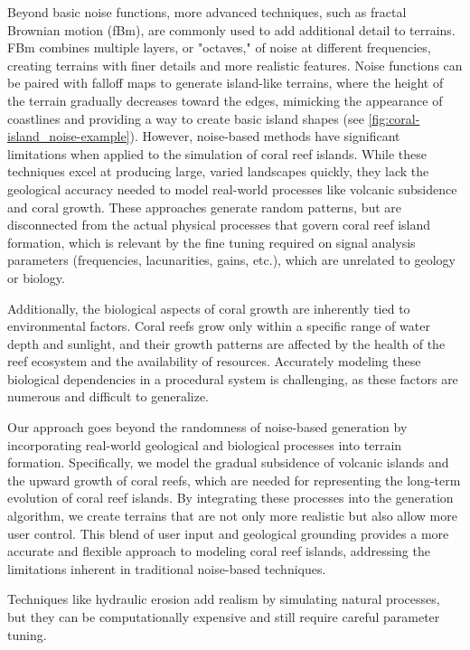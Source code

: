 Beyond basic noise functions, more advanced techniques, such as fractal Brownian motion (fBm), are commonly used to add additional detail to terrains. FBm combines multiple layers, or "octaves," of noise at different frequencies, creating terrains with finer details and more realistic features. Noise functions can be paired with falloff maps to generate island-like terrains, where the height of the terrain gradually decreases toward the edges, mimicking the appearance of coastlines and providing a way to create basic island shapes (see \cref{fig:coral-island_noise-example}). However, noise-based methods have significant limitations when applied to the simulation of coral reef islands. While these techniques excel at producing large, varied landscapes quickly, they lack the geological accuracy needed to model real-world processes like volcanic subsidence and coral growth. These approaches generate random patterns, but are disconnected from the actual physical processes that govern coral reef island formation, which is relevant by the fine tuning required on signal analysis parameters (frequencies, lacunarities, gains, etc.), which are unrelated to geology or biology.


Additionally, the biological aspects of coral growth are inherently tied to environmental factors. Coral reefs grow only within a specific range of water depth and sunlight, and their growth patterns are affected by the health of the reef ecosystem and the availability of resources. Accurately modeling these biological dependencies in a procedural system is challenging, as these factors are numerous and difficult to generalize.



Our approach goes beyond the randomness of noise-based generation by incorporating real-world geological and biological processes into terrain formation. Specifically, we model the gradual subsidence of volcanic islands and the upward growth of coral reefs, which are needed for representing the long-term evolution of coral reef islands. By integrating these processes into the generation algorithm, we create terrains that are not only more realistic but also allow more user control. This blend of user input and geological grounding provides a more accurate and flexible approach to modeling coral reef islands, addressing the limitations inherent in traditional noise-based techniques.



Techniques like hydraulic erosion add realism by simulating natural processes, but they can be computationally expensive and still require careful parameter tuning.

